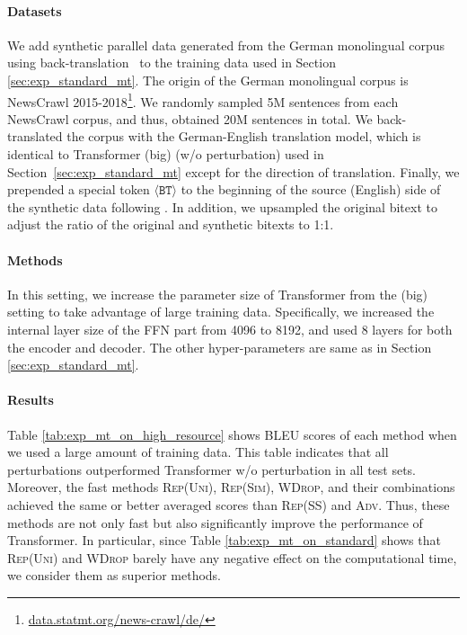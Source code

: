 \documentclass[11pt]{article}
\newcommand{\tagforbt}{$ \langle \texttt{BT} \rangle $}
\newcommand{\uniform}{\textsc{Rep(Uni)}}
\newcommand{\parass}{\textsc{Rep(SS)}}
\newcommand{\similarity}{\textsc{Rep(Sim)}}
\newcommand{\worddrop}{\textsc{WDrop}}
\newcommand{\adv}{\textsc{Adv}}
\begin{document}
\paragraph{Datasets}
We add synthetic parallel data generated from the German monolingual corpus using back-translation~\citep{sennrich:2016:backtrans} to the training data used in Section \ref{sec:exp_standard_mt}.
The origin of the German monolingual corpus is NewsCrawl 2015-2018\footnote{\href{http://data.statmt.org/news-crawl/de/}{data.statmt.org/news-crawl/de/}}.
We randomly sampled 5M sentences from each NewsCrawl corpus, and thus, obtained 20M sentences in total.
We back-translated the corpus with the German-English translation model, which is identical to Transformer (big) (w/o perturbation) used in Section~\ref{sec:exp_standard_mt} except for the direction of translation.
Finally, we prepended a special token \tagforbt{} to the beginning of the source (English) side of the synthetic data following \citep{caswell:2019:tagged}.
In addition, we upsampled the original bitext to adjust the ratio of the original and synthetic bitexts to 1:1.


\paragraph{Methods}
In this setting, we increase the parameter size of Transformer from the (big) setting to take advantage of large training data.
Specifically, we increased the internal layer size of the FFN part from 4096 to 8192, and used 8 layers for both the encoder and decoder.
The other hyper-parameters are same as in Section \ref{sec:exp_standard_mt}.


\paragraph{Results}
Table \ref{tab:exp_mt_on_high_resource} shows BLEU scores of each method when we used a large amount of training data.
This table indicates that all perturbations outperformed Transformer w/o perturbation in all test sets.
Moreover, the fast methods \uniform{}, \similarity{}, \worddrop{}, and their combinations achieved the same or better averaged scores than \parass{} and \adv{}.
Thus, these methods are not only fast but also significantly improve the performance of Transformer.
In particular, since Table \ref{tab:exp_mt_on_standard} shows that \uniform{} and \worddrop{} barely have any negative effect on the computational time, we consider them as superior methods.
\end{document}
